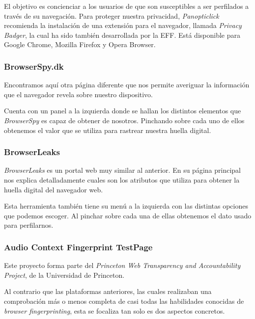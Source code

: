 El objetivo es concienciar a los usuarios de que son susceptibles a ser perfilados a través de su navegación. Para proteger nuestra privacidad, \textit{Panopticlick}\cite{panopticlick} recomienda la instalación de una extensión para el navegador, llamada \textit{Privacy Badger}, la cual ha sido también desarrollada por la EFF. Está disponible para Google Chrome, Mozilla Firefox y Opera Browser. \par 

\subsubsection{BrowserSpy.dk}

Encontramos aquí otra página diferente que nos permite averiguar la información que el navegador revela sobre nuestro dispositivo. \par 

Cuenta con un panel a la izquierda donde se hallan los distintos elementos que \textit{BrowserSpy}\cite{browserSpy} es capaz de obtener de nosotros. Pinchando sobre cada uno de ellos obtenemos el valor que se utiliza para rastrear nuestra huella digital. \par 

\subsubsection{BrowserLeaks}

\textit{BrowserLeaks}\cite{browserLeaks} es un portal web muy similar al anterior. En su página principal nos explica detalladamente cuales son los atributos que utiliza para obtener la huella digital del navegador web. \par 

Esta herramienta también tiene su menú a la izquierda con las distintas opciones que podemos escoger. Al pinchar sobre cada una de ellas obtenemos el dato usado para perfilarnos. \par 

\subsubsection{Audio Context Fingerprint TestPage}

Este proyecto forma parte del \textit{Princeton Web Transparency and Accountability Project}, de la Universidad de Princeton\cite{audio_page}. \par 

Al contrario que las plataformas anteriores, las cuales realizaban una comprobación más o menos completa de casi todas las habilidades conocidas de \textit{browser fingerprinting}, esta se focaliza tan solo es dos aspectos concretos. \par 

